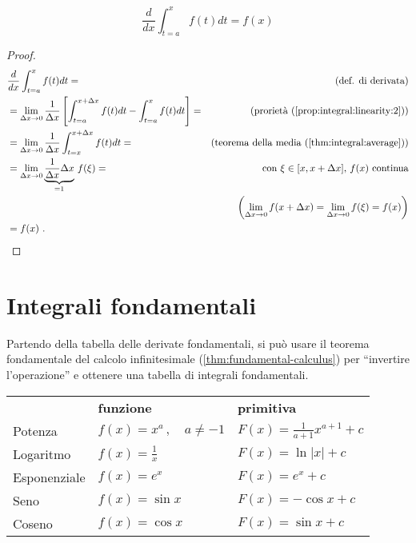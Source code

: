 \begin{theorem}\label{thm:fundamental-calculus}
    \begin{equation}
        \dfrac{d}{dx} \int_{t=a}^{x} f(t) dt = f(x)
    \end{equation}
\end{theorem}
\begin{proof}
\begin{equation}
    \begin{aligned}
        & \dfrac{d}{dx} \int_{t=a}^{x} f(t) dt = & \text{(def. di derivata)} \\ 
        & = \lim_{\Delta x \rightarrow 0} \dfrac{1}{\Delta x} \left[ \int_{t=a}^{x+\Delta x} f(t) dt - \int_{t=a}^{x} f(t) dt\right] = & \text{(prorietà (\ref{prop:integral:linearity:2}))} \\
        & = \lim_{\Delta x \rightarrow 0} \dfrac{1}{\Delta x} \int_{t=x}^{x+\Delta x} f(t) dt = & \text{(teorema della media (\ref{thm:integral:average}))} \\
        & = \lim_{\Delta x \rightarrow 0} \underbrace{\dfrac{1}{\Delta x} \Delta x}_{=1} \, f(\xi) = & \text{con $\xi \in [x, x+\Delta x]$, $f(x)$ continua} \\
        \vspace{-30pt} & & \text{$\left(\lim_{\Delta x \rightarrow 0} f(x+\Delta x) = \lim_{\Delta x \rightarrow 0} f(\xi) = f(x) \right)$} \\
        & = f(x)  \  .
    \end{aligned}
\end{equation}
\end{proof}

\section{Integrali fondamentali}
Partendo della tabella delle derivate fondamentali, si può usare il teorema fondamentale del calcolo infinitesimale (\ref{thm:fundamental-calculus}) per ``invertire l'operazione'' e ottenere una tabella di integrali fondamentali.
\begin{center}
    \begin{tabular}{lll}
        & \textbf{funzione} & \textbf{primitiva} \\
        Potenza      & $f(x) = x^a \, , \quad a \ne -1$ & $F(x) = \frac{1}{a+1} x^{a+1} + c$ \\
        Logaritmo    & $f(x) = \frac{1}{x}$             & $F(x) = \ln{|x|} + c$       \\
        Esponenziale & $f(x) = e^x$                     & $F(x) = e^x + c$          \\
        Seno         & $f(x) = \sin x$                  & $F(x) =-\cos x + c$       \\
        Coseno       & $f(x) = \cos x$                  & $F(x) = \sin x + c$       \\
    \end{tabular}
\end{center}

